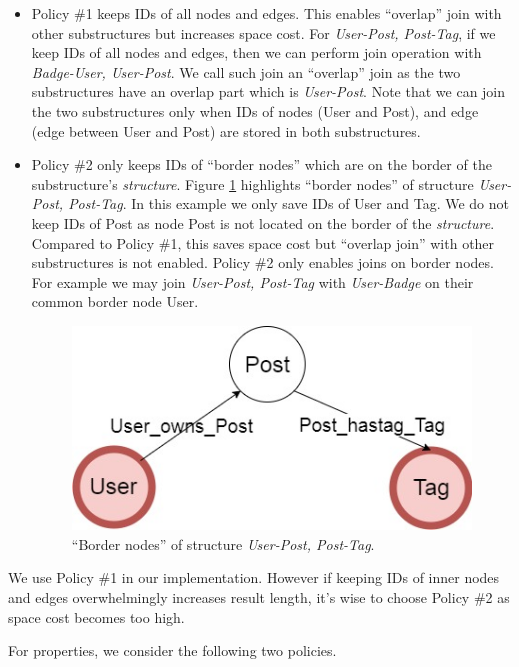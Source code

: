 \begin{itemize}
\item Policy \#1 keeps IDs of all nodes and edges. This enables ``overlap'' join with other substructures but increases space cost. For \textit{User-Post, Post-Tag}, if we keep IDs of all nodes and edges, then we can perform join operation with \textit{Badge-User, User-Post}. We call such join an ``overlap'' join as the two substructures have an overlap part which is \textit{User-Post}. Note that we can join the two substructures only when IDs of nodes (User and Post), and edge (edge between User and Post) are stored in both substructures.

\item Policy \#2 only keeps IDs of ``border nodes'' which are on the border of the substructure's \textit{structure}. Figure \ref{border node} highlights ``border nodes'' of structure \textit{User-Post, Post-Tag}. In this example we only save IDs of User and Tag. We do not keep IDs of Post as node Post is not located on the border of the \textit{structure}. Compared to Policy \#1, this saves space cost but ``overlap join'' with other substructures is not enabled. Policy \#2 only enables joins on border nodes. For example we may join \textit{User-Post, Post-Tag} with \textit{User-Badge} on their common border node User.

\begin{figure}[H]
	\centering
	\includegraphics[scale=0.5]{pic/bordernode.jpg}
	\caption{``Border nodes'' of structure \textit{User-Post, Post-Tag}.}
	\label{border node}
\end{figure}
\end{itemize}


We use Policy \#1 in our implementation. However if keeping IDs of inner nodes and edges overwhelmingly increases result length, it's wise to choose Policy \#2 as space cost becomes too high. 

For properties, we consider the following two policies.

